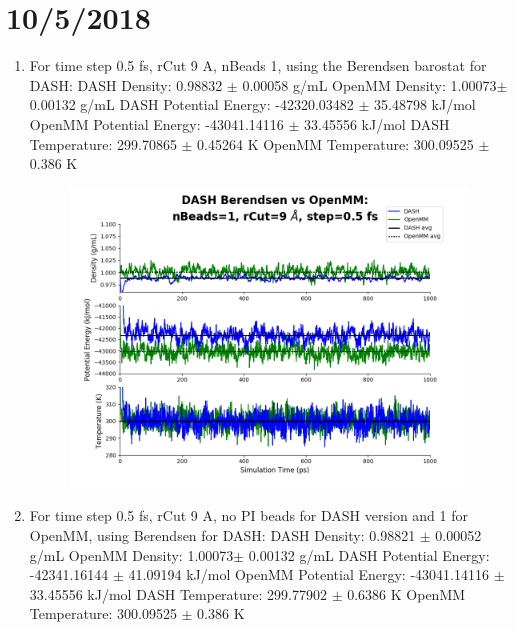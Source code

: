 \documentclass[12pt,reqno]{amsart}
\numberwithin{equation}{section}
\begin{document}
\section{10/5/2018}
\begin{enumerate}
\item For time step 0.5 fs, rCut 9 A, nBeads 1, using the Berendsen barostat for DASH:
\subitem DASH Density: 0.98832 $\pm$ 0.00058 g/mL
\subitem OpenMM Density: 1.00073$\pm$ 0.00132 g/mL
\subitem DASH Potential Energy: -42320.03482 $\pm$  35.48798 kJ/mol
\subitem OpenMM Potential Energy: -43041.14116 $\pm$ 33.45556 kJ/mol
\subitem DASH Temperature: 299.70865 $\pm$ 0.45264  K
\subitem OpenMM Temperature:  300.09525 $\pm$ 0.386 K
\begin{figure}[H]
\centering
\includegraphics[scale=0.7]{B-MM-nBead1-rCut9-ts05}
\end{figure}
\item For time step 0.5 fs, rCut 9 A, no PI beads for DASH version and 1 for OpenMM, using Berendsen for DASH:
\subitem DASH Density: 0.98821 $\pm$ 0.00052 g/mL
\subitem OpenMM Density: 1.00073$\pm$ 0.00132 g/mL
\subitem DASH Potential Energy: -42341.16144 $\pm$  41.09194 kJ/mol
\subitem OpenMM Potential Energy: -43041.14116 $\pm$ 33.45556 kJ/mol
\subitem DASH Temperature: 299.77902 $\pm$ 0.6386  K
\subitem OpenMM Temperature:  300.09525 $\pm$ 0.386 K
\begin{figure}[H]
\centering

\end{figure}
\end{enumerate}
\end{document}
